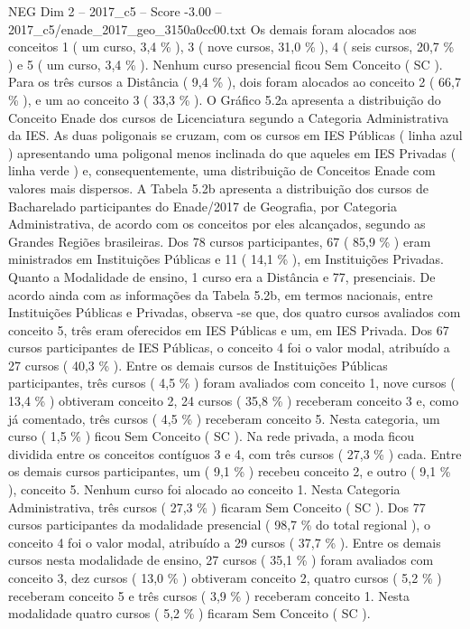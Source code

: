 \begin{textsample}{NEG Dim 2 – 2017\_c5 – Score -3.00 – 2017\_c5/enade\_2017\_geo\_3150a0cc00.txt}
Os demais foram alocados aos conceitos 1 ( um curso, 3,4 \% ), 3 ( nove cursos, 31,0 \% ), 4 ( seis cursos, 20,7 \% ) e 5 ( um curso, 3,4 \% ).
Nenhum curso presencial ficou Sem Conceito ( SC ).
Para os três cursos a Distância ( 9,4 \% ), dois foram alocados ao conceito 2 ( 66,7 \% ), e um ao conceito 3 ( 33,3 \% ).
O Gráfico 5.2a apresenta a distribuição do Conceito Enade dos cursos de Licenciatura segundo a Categoria Administrativa da IES.
As duas poligonais se cruzam, com os cursos em IES Públicas ( linha azul ) apresentando uma poligonal menos inclinada do que aqueles em IES Privadas ( linha verde ) e, consequentemente, uma distribuição de Conceitos Enade com valores mais dispersos.
A Tabela 5.2b apresenta a distribuição dos cursos de Bacharelado participantes do Enade/2017 de Geografia, por Categoria Administrativa, de acordo com os conceitos por eles alcançados, segundo as Grandes Regiões brasileiras.
Dos 78 cursos participantes, 67 ( 85,9 \% ) eram ministrados em Instituições Públicas e 11 ( 14,1 \% ), em Instituições Privadas.
Quanto a Modalidade de ensino, 1 curso era a Distância e 77, presenciais.
De acordo ainda com as informações da Tabela 5.2b, em termos nacionais, entre Instituições Públicas e Privadas, observa -se que, dos quatro cursos avaliados com conceito 5, três eram oferecidos em IES Públicas e um, em IES Privada.
Dos 67 cursos participantes de IES Públicas, o conceito 4 foi o valor modal, atribuído a 27 cursos ( 40,3 \% ).
Entre os demais cursos de Instituições Públicas participantes, três cursos ( 4,5 \% ) foram avaliados com conceito 1, nove cursos ( 13,4 \% ) obtiveram conceito 2, 24 cursos ( 35,8 \% ) receberam conceito 3 e, como já comentado, três cursos ( 4,5 \% ) receberam conceito 5.
Nesta categoria, um curso ( 1,5 \% ) ficou Sem Conceito ( SC ).
Na rede privada, a moda ficou dividida entre os conceitos contíguos 3 e 4, com três cursos ( 27,3 \% ) cada.
Entre os demais cursos participantes, um ( 9,1 \% ) recebeu conceito 2, e outro ( 9,1 \% ), conceito 5.
Nenhum curso foi alocado ao conceito 1.
Nesta Categoria Administrativa, três cursos ( 27,3 \% ) ficaram Sem Conceito ( SC ).
Dos 77 cursos participantes da modalidade presencial ( 98,7 \% do total regional ), o conceito 4 foi o valor modal, atribuído a 29 cursos ( 37,7 \% ).
Entre os demais cursos nesta modalidade de ensino, 27 cursos ( 35,1 \% ) foram avaliados com conceito 3, dez cursos ( 13,0 \% ) obtiveram conceito 2, quatro cursos ( 5,2 \% ) receberam conceito 5 e três cursos ( 3,9 \% ) receberam conceito 1.
Nesta modalidade quatro cursos ( 5,2 \% ) ficaram Sem Conceito ( SC ).

\end{textsample}
